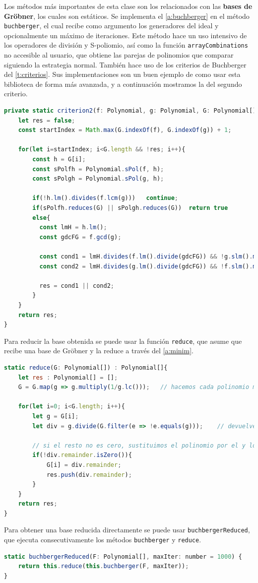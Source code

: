 Los métodos más importantes de esta clase son los relacionados con las \textbf{bases de Gröbner}, los cuales son estáticos. Se implementa el \autoref{a:buchberger} en el método \texttt{buchberger}, el cual recibe como argumento los generadores del ideal y opcionalmente un máximo de iteraciones. Este método hace un uso intensivo de los operadores de división y S-poliomio, así como la función \texttt{arrayCombinations} no accesible al usuario, que obtiene las parejas de polinomios que comparar siguiendo la estrategia normal. También hace uso de los criterios de Buchberger del \autoref{t:criterios}. Sus implementaciones son un buen ejemplo de como usar esta biblioteca de forma más avanzada, y a continuación mostramos la del segundo criterio.
\begin{lstlisting}[language=Javascript]
private static criterion2(f: Polynomial, g: Polynomial, G: Polynomial[]) : boolean {
    let res = false;
    const startIndex = Math.max(G.indexOf(f), G.indexOf(g)) + 1;

    for(let i=startIndex; i<G.length && !res; i++){
        const h = G[i];
        const sPolfh = Polynomial.sPol(f, h);
        const sPolgh = Polynomial.sPol(g, h);
    
        if(!h.lm().divides(f.lcm(g)))   continue;
        if(sPolfh.reduces(G) || sPolgh.reduces(G))  return true
        else{
          const lmH = h.lm();
          const gdcFG = f.gcd(g);
    
          const cond1 = lmH.divides(f.lm().divide(gdcFG)) && !g.slm().multiply(h.lm()).equals(h.slm().multiply(g.lm()));
          const cond2 = lmH.divides(g.lm().divide(gdcFG)) && !f.slm().multiply(h.lm()).equals(h.slm().multiply(f.lm()));
    
          res = cond1 || cond2;
        }
    }
    return res;
}
\end{lstlisting}
Para reducir la base obtenida se puede usar la función \texttt{reduce}, que asume que recibe una base de Gröbner y la reduce a través del \autoref{a:minim}. 
\begin{lstlisting}[language=Javascript]
static reduce(G: Polynomial[]) : Polynomial[]{
    let res : Polynomial[] = [];
    G = G.map(g => g.multiply(1/g.lc()));   // hacemos cada polinomio mónico (lc=1)

    for(let i=0; i<G.length; i++){
        let g = G[i];
        let div = g.divide(G.filter(e => !e.equals(g)));    // devuelve el resto y los coeficientes

        // si el resto no es cero, sustituimos el polinomio por el y lo añadimos a la base resultado 
        if(!div.remainder.isZero()){
            G[i] = div.remainder;
            res.push(div.remainder);
        }
    }
    return res;
}
\end{lstlisting}
Para obtener una base reducida directamente se puede usar \texttt{buchbergerReduced}, que ejecuta consecutivamente los métodos \texttt{buchberger} y \texttt{reduce}.
\begin{lstlisting}[language=Javascript]
static buchbergerReduced(F: Polynomial[], maxIter: number = 1000) {
    return this.reduce(this.buchberger(F, maxIter));
}
\end{lstlisting}

